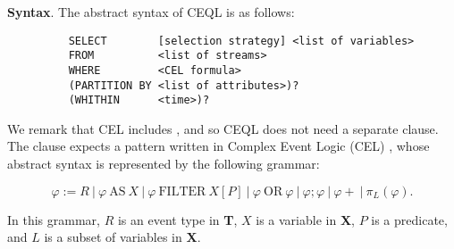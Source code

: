 \textbf{Syntax}. The abstract syntax of CEQL is as follows:

\begin{figure}[H]
  \begin{verbatim}
    SELECT        [selection strategy] <list of variables>
    FROM          <list of streams>
    WHERE         <CEL formula>
    (PARTITION BY <list of attributes>)?
    (WHITHIN      <time>)?
  \end{verbatim}
\end{figure}

\vspace{-30pt}
We remark that CEL includes , and so CEQL does not need a separate  clause. The  clause expects a pattern written in Complex Event Logic (CEL) \cite{formal-framework-cer}, whose abstract syntax is represented by the following grammar:

\vspace{-20pt}
\begin{equation*}
  \varphi := R    \ | \ \varphi \ \text{AS} \ X    \ | \    \varphi \ \text{FILTER} \ X[P]  \ | \   \varphi \ \text{OR} \ \varphi   \ | \  \varphi ; \varphi    \ | \  \varphi+ \ | \ \pi_{L}(\varphi).
\end{equation*}

\vspace{-10pt}
In this grammar, $R$ is an event type in \textbf{T}, $X$ is a variable in \textbf{X}, $P$ is a predicate, and $L$ is a subset of variables in \textbf{X}.

